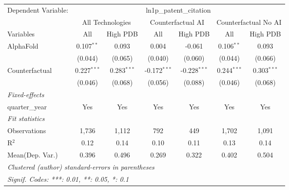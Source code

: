 \begingroup
\centering
\begin{tabular}{lcccccc}
   \tabularnewline \midrule \midrule
   Dependent Variable: & \multicolumn{6}{c}{ln1p\_patent\_citation}\\
 & \multicolumn{2}{c}{All Technologies} & \multicolumn{2}{c}{Counterfactual AI} & \multicolumn{2}{c}{Counterfactual No AI} \\
\cmidrule(lr){1-1}\cmidrule(lr){2-3} \cmidrule(lr){4-5} \cmidrule(lr){6-7}
Variables & \multicolumn{1}{c}{All} & \multicolumn{1}{c}{High PDB} & \multicolumn{1}{c}{All} & \multicolumn{1}{c}{High PDB} & \multicolumn{1}{c}{All} & \multicolumn{1}{c}{High PDB} \\
\cmidrule(lr){1-1}\cmidrule(lr){2-2} \cmidrule(lr){3-3} \cmidrule(lr){4-4} \cmidrule(lr){5-5} \cmidrule(lr){6-6} \cmidrule(lr){7-7}
   AlphaFold      & 0.107$^{**}$  & 0.093         & 0.004          & -0.061         & 0.106$^{**}$  & 0.093\\   
                  & (0.044)       & (0.065)       & (0.040)        & (0.060)        & (0.044)       & (0.066)\\   
   Counterfactual & 0.227$^{***}$ & 0.283$^{***}$ & -0.172$^{***}$ & -0.228$^{***}$ & 0.244$^{***}$ & 0.303$^{***}$\\   
                  & (0.046)       & (0.068)       & (0.056)        & (0.088)        & (0.046)       & (0.068)\\   
   \midrule
   \emph{Fixed-effects}\\
   quarter\_year  & Yes           & Yes           & Yes            & Yes            & Yes           & Yes\\  
   \midrule
   \emph{Fit statistics}\\
   Observations   & 1,736         & 1,112         & 792            & 449            & 1,702         & 1,091\\  
   R$^2$          & 0.12          & 0.14          & 0.10           & 0.11           & 0.13          & 0.14\\  
Mean(Dep. Var.) & 0.396 & 0.496 & 0.269 & 0.322 & 0.402 & 0.504 \\
   \midrule \midrule
   \multicolumn{7}{l}{\emph{Clustered (author) standard-errors in parentheses}}\\
   \multicolumn{7}{l}{\emph{Signif. Codes: ***: 0.01, **: 0.05, *: 0.1}}\\
\end{tabular}
\par\endgroup
